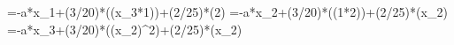=-a*x_1+(3/20)*\sin((x_3*1))+(2/25)*\cos(2)
=-a*x_2+(3/20)*\sin((1*2))+(2/25)*\cos(x_2)
=-a*x_3+(3/20)*\sin((x_2)^2)+(2/25)*\cos(x_2)
